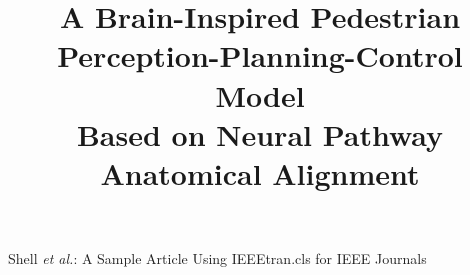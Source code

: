 \documentclass[lettersize,journal]{IEEEtran}
\begin{document}
\title{A Brain-Inspired Pedestrian \\ Perception-Planning-Control Model \\Based on Neural Pathway Anatomical Alignment}


%
{Shell \MakeLowercase{\textit{et al.}}: A Sample Article Using IEEEtran.cls for IEEE Journals}


\maketitle

    










\end{document}
